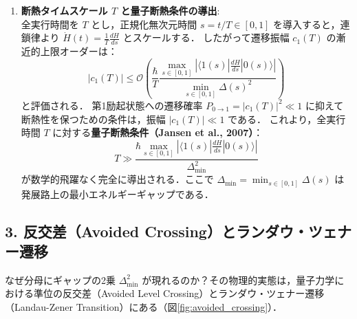 \documentclass[11pt,a4paper,oneside,openany]{ltjsbook}
\theoremstyle{definition}
\theoremstyle{plain}
\theoremstyle{remark}
\newcommand{\mel}[3]{\langle#1|#2|#3\rangle}
\begin{document}
\begin{insightbox}
\begin{enumerate}[label=\textbf{Step \arabic* :}, leftmargin=*]
    \item \textbf{断熱タイムスケール $T$ と量子断熱条件の導出}:\\
    全実行時間を $T$ とし，正規化無次元時間 $s = t/T \in [0, 1]$ を導入すると，連鎖律より $\dot{H}(t) = \frac{1}{T}\frac{dH}{ds}$ とスケールする．
    したがって遷移振幅 $c_1(T)$ の漸近的上限オーダーは：
    \begin{equation}
        |c_1(T)| \le \mathcal{O}\left( \frac{\hbar}{T} \frac{\max_{s \in [0, 1]} \left| \mel{1(s)}{\frac{dH}{ds}}{0(s)} \right|}{\min_{s \in [0, 1]} \Delta(s)^2} \right)
    \end{equation}
    と評価される．
    第1励起状態への遷移確率 $P_{0 \to 1} = |c_1(T)|^2 \ll 1$ に抑えて断熱性を保つための条件は，振幅 $|c_1(T)| \ll 1$ である．
    これより，全実行時間 $T$ に対する\textbf{量子断熱条件（Jansen et al., 2007\cite{jansen2007bounds}）}：
    \begin{equation}
        T \gg \frac{\hbar \max_{s \in [0, 1]} \left| \mel{1(s)}{\frac{dH}{ds}}{0(s)} \right|}{\Delta_{\min}^2}
    \end{equation}
    が数学的飛躍なく完全に導出される．ここで $\Delta_{\min} = \min_{s \in [0, 1]} \Delta(s)$ は発展路上の最小エネルギーギャップである．
\end{enumerate}
\end{insightbox}

\subsection{3. 反交差（Avoided Crossing）とランダウ・ツェナー遷移}
なぜ分母にギャップの2乗 $\Delta_{\min}^2$ が現れるのか？その物理的実態は，量子力学における準位の反交差（Avoided Level Crossing）とランダウ・ツェナー遷移（Landau-Zener Transition）\cite{landau1932theorie,zener1932non}にある（図\ref{fig:avoided_crossing}）．
\end{document}
